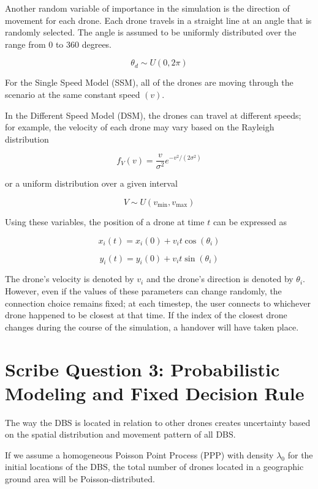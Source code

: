 \documentclass[12pt,a4paper]{article}
\begin{document}
Another random variable of importance in the simulation is the direction of movement for each drone. Each drone travels in a straight line at an angle that is randomly selected. The angle is assumed to be uniformly distributed over the range from 0 to 360 degrees.

\[
\theta_d \sim U(0,2\pi)
\]

For the Single Speed Model (SSM), all of the drones are moving through the scenario at the same constant speed $(v)$.

In the Different Speed Model (DSM), the drones can travel at different speeds; for example, the velocity of each drone may vary based on the Rayleigh distribution

\[
f_V(v) = \frac{v}{\sigma^2} e^{-v^2/(2\sigma^2)}
\]

or a uniform distribution over a given interval

\[
V \sim U(v_{\min}, v_{\max})
\]

Using these variables, the position of a drone at time $t$ can be expressed as

\[
x_i(t) = x_i(0) + v_i t \cos(\theta_i)
\]

\[
y_i(t) = y_i(0) + v_i t \sin(\theta_i)
\]

The drone's velocity is denoted by $v_i$ and the drone's direction is denoted by $\theta_i$. However, even if the values of these parameters can change randomly, the connection choice remains fixed; at each timestep, the user connects to whichever drone happened to be closest at that time. If the index of the closest drone changes during the course of the simulation, a handover will have taken place.


\section{Scribe Question 3: Probabilistic Modeling and Fixed Decision Rule}

The way the DBS is located in relation to other drones creates uncertainty based on the spatial distribution and movement pattern of all DBS.

If we assume a homogeneous Poisson Point Process (PPP) with density $\lambda_0$ for the initial locations of the DBS, the total number of drones located in a geographic ground area will be Poisson-distributed.
\end{document}
